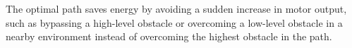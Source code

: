 \documentclass[journal]{./template/IEEEtran}
\begin{document}
The optimal path saves energy by avoiding a sudden increase in motor output, such as bypassing a high-level obstacle or overcoming a low-level obstacle in a nearby environment instead of overcoming the highest obstacle in the path.

\begin{figure}[htp!b]
\centering
{}

\end{figure}
\end{document}
